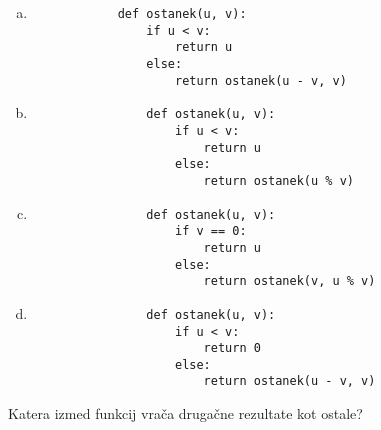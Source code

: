 \documentclass[arhiv, 10pt]{../izpit}
\begin{document}
        \begin{multicols}{2}
        \begin{enumerate}[(a)]
\item 
            \begin{verbatim}
            def ostanek(u, v):
                if u < v:
                    return u
                else:
                    return ostanek(u - v, v)
            \end{verbatim}
        
\item 
                \begin{verbatim}
                def ostanek(u, v):
                    if u < v:
                        return u
                    else:
                        return ostanek(u % v)
                \end{verbatim}
            
\item 
                \begin{verbatim}
                def ostanek(u, v):
                    if v == 0:
                        return u
                    else:
                        return ostanek(v, u % v)
                \end{verbatim}
            
\item 
                \begin{verbatim}
                def ostanek(u, v):
                    if u < v:
                        return 0
                    else:
                        return ostanek(u - v, v)
                \end{verbatim}
            
\end{enumerate}

        \end{multicols}
    
        \naloga*
        
        Katera izmed funkcij vrača drugačne rezultate kot ostale?
    
\end{document}
